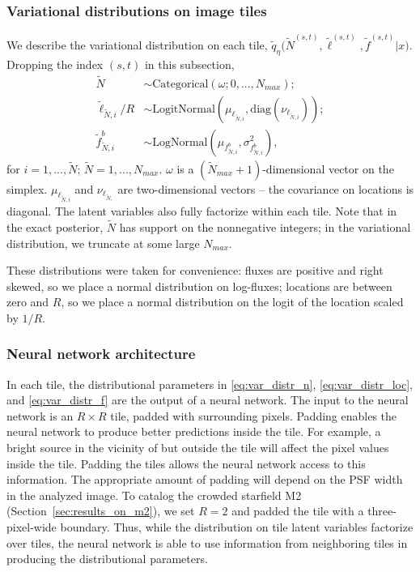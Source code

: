 \subsubsection{Variational distributions on image tiles}
We describe the variational distribution on each tile,
$\tilde q_\eta\big(\tilde N^{(s, t)}, \tilde \ell^{(s, t)}, \tilde f^{(s, t)} | x\big)$. Dropping the index 
$(s,t)$ in this subsection, 
\begin{align}
    \tilde N &\sim \text{Categorical}(
    \omega; 0, ..., N_{max});  \label{eq:var_distr_n}\\
	\tilde \ell_{\tilde N, i} / R &\sim \text{LogitNormal}(\mu_{\ell_{\tilde N, i}}, \text{diag}(\nu_{\ell_{\tilde N, i}}) )\label{eq:var_distr_loc}; \\
	\tilde f^b_{\tilde N, i} &\sim \text{LogNormal}(\mu_{f^b_{\tilde N, i}}, \sigma^2_{f^b_{\tilde N, i}}), \label{eq:var_distr_f}
\end{align}
for $i = 1, ..., \tilde N$; $\tilde{N} = 1, ..., N_{max}$. 
$\omega$ is a $(\tilde N_{max} + 1)$-dimensional vector on the simplex. $\mu_{\ell_{\tilde N, i}}$ and $\nu_{\ell_{\tilde N, }}$ are two-dimensional vectors -- the covariance on locations is diagonal. 
The latent variables also fully factorize within each tile. Note that in the exact posterior, $\tilde N$ has support on the nonnegative integers; in the variational distribution, we truncate at some large $N_{max}$. 


These distributions were taken for convenience: fluxes are positive and right skewed, so we place a normal distribution on log-fluxes; locations are between zero and $R$, so 
we place a normal distribution on the logit of the location scaled by $1 / R$. 

\subsubsection{Neural network architecture}
\label{sec:nn_archetecture}

In each tile, the distributional parameters in \eqref{eq:var_distr_n},
\eqref{eq:var_distr_loc}, and \eqref{eq:var_distr_f} are the output of a neural network. 
The input to the neural network is an $R \times R$ tile, padded with surrounding pixels.
Padding enables the neural network to produce better predictions inside the tile. 
For example, a bright source in the vicinity of but outside the tile will affect the pixel values inside the tile. 
Padding the tiles allows the neural network access to this information. 
The appropriate amount of padding will depend on the PSF width in the analyzed image. 
To catalog the crowded starfield M2 (Section~\ref{sec:results_on_m2}),
we set $R = 2$ and padded the tile with a three-pixel-wide boundary.
Thus, while the distribution on tile latent variables factorize over tiles, the neural network is able to use information from neighboring tiles in producing the distributional parameters. 


